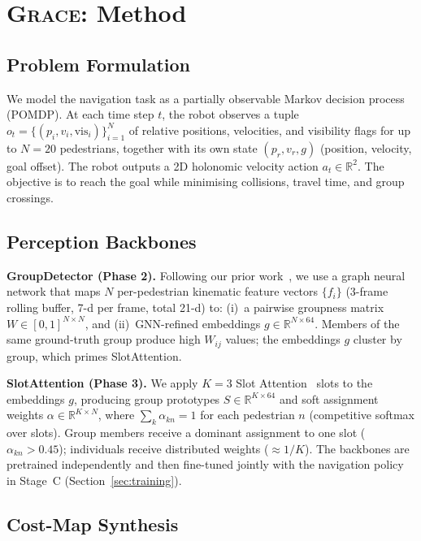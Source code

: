\documentclass{article}
\newcommand{\grace}{\textsc{Grace}}
\begin{document}
\section{\grace{}: Method}
\label{sec:method}

\subsection{Problem Formulation}
\label{sec:problem}

We model the navigation task as a partially observable Markov decision process
(POMDP). At each time step $t$, the robot observes a tuple
$o_t = \{(p_i, v_i, \text{vis}_i)\}_{i=1}^{N}$ of relative positions,
velocities, and visibility flags for up to $N=20$ pedestrians, together with
its own state $(p_r, v_r, g)$ (position, velocity, goal offset).
The robot outputs a 2D holonomic velocity action $a_t \in \mathbb{R}^2$.
The objective is to reach the goal while minimising collisions, travel time,
and group crossings.

\subsection{Perception Backbones}
\label{sec:perception}

\textbf{GroupDetector (Phase 2).}
Following our prior work~\citep{roy2025gramv2}, we use a graph neural network
that maps $N$ per-pedestrian kinematic feature vectors $\{f_i\}$ (3-frame rolling
buffer, 7-d per frame, total 21-d) to:
(i)~a pairwise groupness matrix $W \in [0,1]^{N \times N}$, and
(ii)~GNN-refined embeddings $g \in \mathbb{R}^{N \times 64}$.
Members of the same ground-truth group produce high $W_{ij}$ values; the embeddings
$g$ cluster by group, which primes SlotAttention.

\textbf{SlotAttention (Phase 3).}
We apply $K=3$ Slot Attention~\citep{locatello2020object} slots to the embeddings
$g$, producing group prototypes $S \in \mathbb{R}^{K \times 64}$ and soft
assignment weights $\alpha \in \mathbb{R}^{K \times N}$, where
$\sum_k \alpha_{kn} = 1$ for each pedestrian $n$ (competitive softmax over slots).
Group members receive a dominant assignment to one slot ($\alpha_{kn} > 0.45$);
individuals receive distributed weights ($\approx 1/K$). The backbones are
pretrained independently and then fine-tuned jointly with the navigation policy
in Stage~C (Section~\ref{sec:training}).

\subsection{Cost-Map Synthesis}
\label{sec:cost_map}
\end{document}
